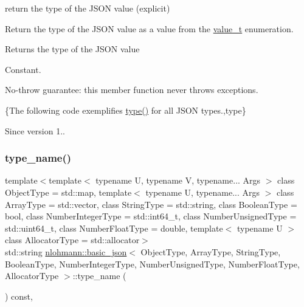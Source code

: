 return the type of the J\+S\+ON value (explicit) 

Return the type of the J\+S\+ON value as a value from the \hyperlink{classnlohmann_1_1basic__json_a231b02148577b69a154b2ce2c87a5522}{value\+\_\+t} enumeration.

\begin{DoxyReturn}{Returns}
the type of the J\+S\+ON value
\end{DoxyReturn}
Constant.

No-\/throw guarantee\+: this member function never throws exceptions.

\{The following code exemplifies {\ttfamily \hyperlink{classnlohmann_1_1basic__json_a5d466b240d0ba9f648d7fd4ff42359f5}{type()}} for all J\+S\+ON types.,type\}

\begin{DoxySince}{Since}
version 1.. 
\end{DoxySince}
\hypertarget{classnlohmann_1_1basic__json_a4afa0c4179a63e19975975a36ebbb9c2}{}\label{classnlohmann_1_1basic__json_a4afa0c4179a63e19975975a36ebbb9c2} 
\subsubsection{\texorpdfstring{type\+\_\+name()}{type\_name()}}
{\footnotesize\ttfamily template$<$template$<$ typename U, typename V, typename... Args $>$ class Object\+Type = std\+::map, template$<$ typename U, typename... Args $>$ class Array\+Type = std\+::vector, class String\+Type  = std\+::string, class Boolean\+Type  = bool, class Number\+Integer\+Type  = std\+::int64\+\_\+t, class Number\+Unsigned\+Type  = std\+::uint64\+\_\+t, class Number\+Float\+Type  = double, template$<$ typename U $>$ class Allocator\+Type = std\+::allocator$>$ \\
std\+::string \hyperlink{classnlohmann_1_1basic__json}{nlohmann\+::basic\+\_\+json}$<$ Object\+Type, Array\+Type, String\+Type, Boolean\+Type, Number\+Integer\+Type, Number\+Unsigned\+Type, Number\+Float\+Type, Allocator\+Type $>$\+::type\+\_\+name (\begin{DoxyParamCaption}{ }\end{DoxyParamCaption}) const\hspace{0.3cm}{\ttfamily [inline]}, {\ttfamily [private]}}



